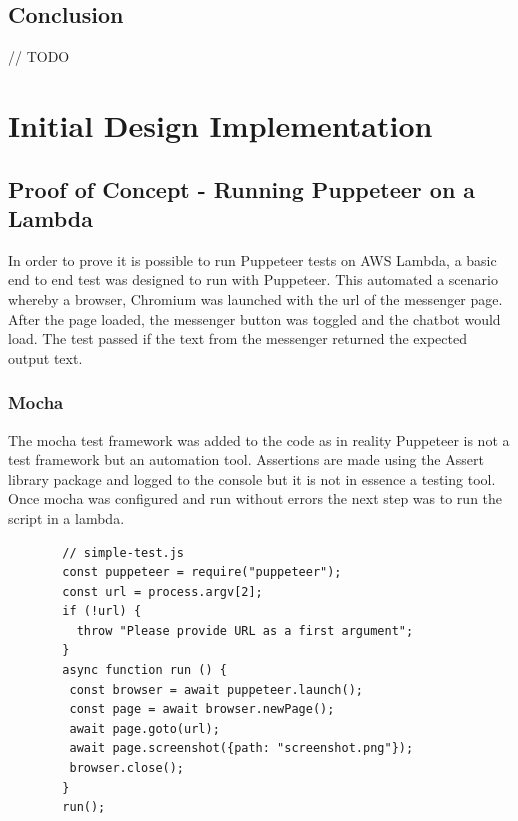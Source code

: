 \documentclass[12pt,a4paper,titlepage]{report}
\begin{document}
\section{Conclusion}
// TODO

\chapter{Initial Design Implementation}

\section{Proof of Concept - Running Puppeteer on a Lambda}

In order to prove it is possible to run Puppeteer tests on AWS Lambda, a basic end to end test was designed
to run with Puppeteer. This automated a scenario whereby a browser, Chromium was launched with the url of the
messenger page. After the page loaded, the messenger button was toggled and the chatbot would load. The test
passed if the text from the messenger returned the expected output text.

\subsection{Mocha}

The mocha test framework was added to the code as in reality Puppeteer is not a test framework but an automation tool.
Assertions are made using the Assert library package and logged to the console but it is not in essence a testing tool.
Once mocha was configured and run without errors the next step was to run the script in a lambda.

\begin{figure}[h]
 \begin{tcolorbox}
  \begin{verbatim}
  // simple-test.js
  const puppeteer = require("puppeteer");
  const url = process.argv[2];
  if (!url) {
    throw "Please provide URL as a first argument";
  }
  async function run () {
   const browser = await puppeteer.launch();
   const page = await browser.newPage();
   await page.goto(url);
   await page.screenshot({path: "screenshot.png"});
   browser.close();
  }
  run();
\end{verbatim}
\end{tcolorbox}
\end{figure}
\end{document}

